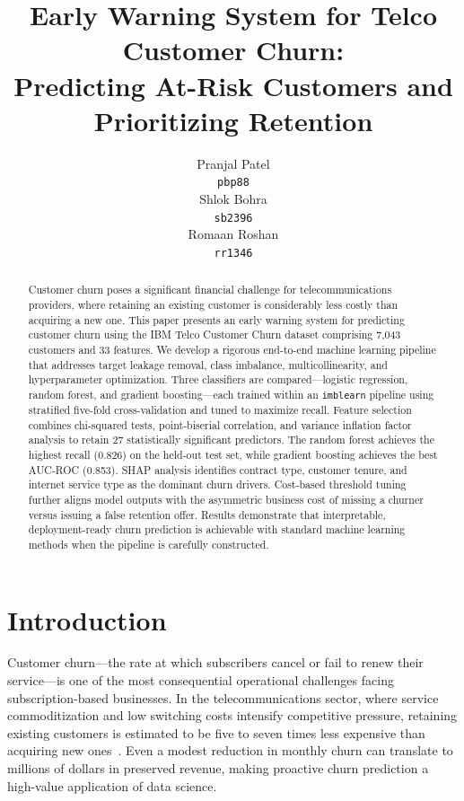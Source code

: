 \documentclass{article}
\title{Early Warning System for Telco Customer Churn:\\
Predicting At-Risk Customers and Prioritizing Retention}
\author{%
  Pranjal Patel \\
  \texttt{pbp88} \\
  \And
  Shlok Bohra \\
  \texttt{sb2396} \\
  \And
  Romaan Roshan \\
  \texttt{rr1346} \\
}
\begin{document}
\maketitle

\begin{abstract}
Customer churn poses a significant financial challenge for telecommunications providers,
where retaining an existing customer is considerably less costly than acquiring a new one.
This paper presents an early warning system for predicting customer churn using the IBM
Telco Customer Churn dataset comprising 7,043 customers and 33 features.
We develop a rigorous end-to-end machine learning pipeline that addresses target leakage
removal, class imbalance, multicollinearity, and hyperparameter optimization.
Three classifiers are compared---logistic regression, random forest, and gradient
boosting---each trained within an \texttt{imblearn} pipeline using stratified
five-fold cross-validation and tuned to maximize recall.
Feature selection combines chi-squared tests, point-biserial correlation, and variance
inflation factor analysis to retain 27 statistically significant predictors.
The random forest achieves the highest recall (0.826) on the held-out test set, while
gradient boosting achieves the best AUC-ROC (0.853).
SHAP analysis identifies contract type, customer tenure, and internet service type
as the dominant churn drivers.
Cost-based threshold tuning further aligns model outputs with the asymmetric
business cost of missing a churner versus issuing a false retention offer.
Results demonstrate that interpretable, deployment-ready churn prediction is achievable
with standard machine learning methods when the pipeline is carefully constructed.
\end{abstract}


\section{Introduction}

Customer churn---the rate at which subscribers cancel or fail to renew their service---is
one of the most consequential operational challenges facing subscription-based businesses.
In the telecommunications sector, where service commoditization and low switching costs
intensify competitive pressure, retaining existing customers is estimated to be five to
seven times less expensive than acquiring new ones~\citep{vandenPoel2004}.
Even a modest reduction in monthly churn can translate to millions of dollars in preserved
revenue, making proactive churn prediction a high-value application of data science.
\end{document}
